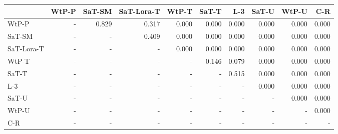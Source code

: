 \begin{tabular}{lrrrrrrrrr}
\toprule
 & WtP-P & SaT-SM & SaT-Lora-T & WtP-T & SaT-T & L-3 & SaT-U & WtP-U & C-R \\
\midrule
WtP-P & - & 0.829 & 0.317 & 0.000 & 0.000 & 0.000 & 0.000 & 0.000 & 0.000 \\
SaT-SM & - & - & 0.409 & 0.000 & 0.000 & 0.000 & 0.000 & 0.000 & 0.000 \\
SaT-Lora-T & - & - & - & 0.000 & 0.000 & 0.000 & 0.000 & 0.000 & 0.000 \\
WtP-T & - & - & - & - & 0.146 & 0.079 & 0.000 & 0.000 & 0.000 \\
SaT-T & - & - & - & - & - & 0.515 & 0.000 & 0.000 & 0.000 \\
L-3 & - & - & - & - & - & - & 0.000 & 0.000 & 0.000 \\
SaT-U & - & - & - & - & - & - & - & 0.000 & 0.000 \\
WtP-U & - & - & - & - & - & - & - & - & 0.000 \\
C-R & - & - & - & - & - & - & - & - & - \\
\bottomrule
\end{tabular}

